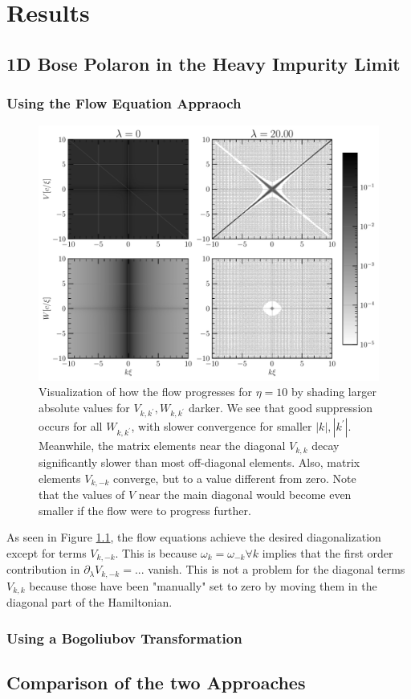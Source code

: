 \chapter{Results}\label{Results}
\section{1D Bose Polaron in the Heavy Impurity Limit}
\subsection{Using the Flow Equation Appraoch}
\begin{figure}[H]
    \centering
    \includegraphics[width=\textwidth]{figures/plots/PDF/FlowIllustration.pdf}
    \caption{Visualization of how the flow progresses for $\eta=10$ by shading larger absolute values for $V_{k,k^\prime},W_{k,k^\prime}$ darker. We see that good suppression occurs for all $W_{k,k^\prime}$, with slower convergence for smaller $|k|,|k^\prime|$.  Meanwhile, the matrix elements near the diagonal $V_{k,k}$ decay significantly slower than most off-diagonal elements. Also, matrix elements $V_{k,-k}$ converge, but to a value different from zero. Note that the values of $V$ near the main diagonal would  become even smaller if the flow were to progress further.}
    \label{FlowIllustration}
\end{figure}
As seen in Figure \ref{FlowIllustration}, the flow equations achieve the desired diagonalization except for terms $V_{k,-k}$. This is because $\omega_k=\omega_{-k}\forall k$ implies that the first order contribution in $\partial_\lambda V_{k,-k} =...$ vanish. This is not a problem for the diagonal terms $V_{k,k}$ because those have been "manually" set to zero by moving them in the diagonal part of the Hamiltonian. 
\subsection{Using a Bogoliubov Transformation}
\section{Comparison of the two Approaches}